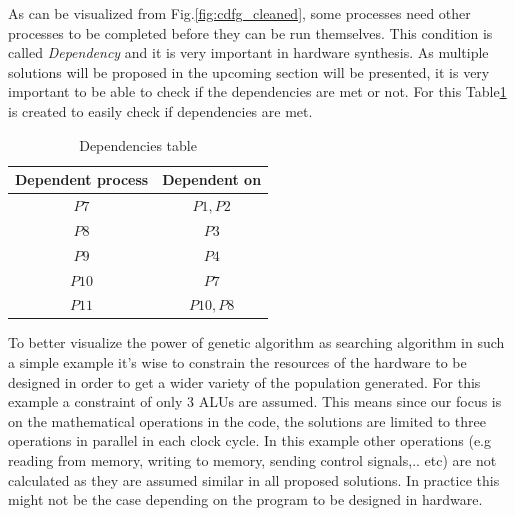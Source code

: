 \documentclass[conference]{IEEEtran}
\begin{document}
As can be visualized from Fig.\ref{fig:cdfg_cleaned}, some processes need other processes to be completed before they can be run themselves. This condition is called \textit{Dependency} and it is very important in hardware synthesis. As multiple solutions will be proposed in the upcoming section will be presented, it is very important to be able to check if the dependencies are met or not. For this Table\ref{tab:Dependencies} is created to easily check if dependencies are met.
\begin{table}
    \centering
    \begin{tabular}{|c|c|}
    \hline
       Dependent process  & Dependent on \\
       \hline \hline
       $P7$  &  $P1,P2$ \\
       \hline
        $P8$ & $P3$ \\
        \hline
       $P9$ & $P4$ \\
       \hline
       $P10$ & $P7$ \\
       \hline
       $P11$ & $P10,P8$ \\
       \hline
    \end{tabular}
    \vspace{2pt}
    \caption{Dependencies table}
    \label{tab:Dependencies}
\end{table}

To better visualize the power of genetic algorithm as searching algorithm in such a simple example it's wise to constrain the resources of the hardware to be designed in order to get a wider variety of the population generated. For this example a constraint of only 3 ALUs are assumed. This means since our focus is on the mathematical operations in the code, the solutions are limited to three operations in parallel in each clock cycle. In this example other operations (e.g reading from memory, writing to memory, sending control signals,.. etc) are not calculated as they are assumed similar in all proposed solutions. In practice this might not be the case depending on the program to be designed in hardware.
\end{document}
